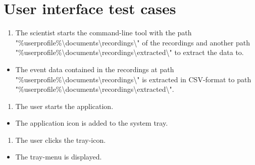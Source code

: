 \section{User interface test cases}

\begin{tests}
\setcounter{counterTC}{290}
    {\begin{enumerate}
        \item The \gls{scientist} starts the command-line tool with the path "\%userprofile\%\textbackslash documents\textbackslash recordings\textbackslash" of the recordings and another path "\%userprofile\%\textbackslash documents\textbackslash recordings\textbackslash extracted\textbackslash" to extract the data to.
    \end{enumerate}}
    {\begin{itemize}
        \item The \gls{event} data contained in the recordings at path "\%userprofile\%\textbackslash documents\textbackslash recordings\textbackslash" is extracted in CSV-format to path "\%userprofile\%\textbackslash documents\textbackslash recordings\textbackslash extracted\textbackslash".
    \end{itemize}}

    {\begin{enumerate}
        \item The \gls{user} starts the application.
    \end{enumerate}}
    {\begin{itemize}
        \item The application icon is added to the system tray.
    \end{itemize}}

    {\begin{enumerate}
        \item The \gls{user} clicks the tray-icon.
    \end{enumerate}}
    {\begin{itemize}
        \item The tray-menu is displayed.
    \end{itemize}}
\end{tests}

